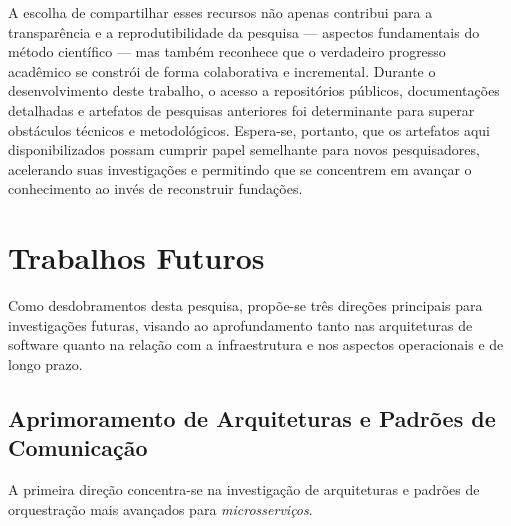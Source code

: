 A escolha de compartilhar esses recursos não apenas contribui para a transparência e a reprodutibilidade da pesquisa — aspectos fundamentais do método científico — mas também reconhece que o verdadeiro progresso acadêmico se constrói de forma colaborativa e incremental. Durante o desenvolvimento deste trabalho, o acesso a repositórios públicos, documentações detalhadas e artefatos de pesquisas anteriores foi determinante para superar obstáculos técnicos e metodológicos. Espera-se, portanto, que os artefatos aqui disponibilizados possam cumprir papel semelhante para novos pesquisadores, acelerando suas investigações e permitindo que se concentrem em avançar o conhecimento ao invés de reconstruir fundações.

\section{Trabalhos Futuros}

Como desdobramentos desta pesquisa, propõe-se três direções principais para investigações futuras, visando ao aprofundamento tanto nas arquiteturas de software quanto na relação com a infraestrutura e nos aspectos operacionais e de longo prazo.

\subsection{Aprimoramento de Arquiteturas e Padrões de Comunicação}

A primeira direção concentra-se na investigação de arquiteturas e padrões de orquestração mais avançados para \textit{microsserviços}.

